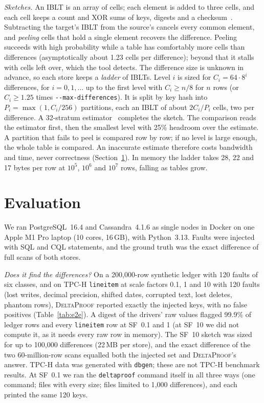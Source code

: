 \documentclass[conference]{IEEEtran}
\newcommand{\sys}{\textsc{DeltaProof}}
\begin{document}
\emph{Sketches.} An IBLT is an array of cells; each element is added to three cells, and each cell keeps a count and XOR sums of keys, digests and a checksum~\cite{goodrich2011}. Subtracting the target's IBLT from the source's cancels every common element, and \emph{peeling} cells that hold a single element recovers the difference. Peeling succeeds with high probability while a table has comfortably more cells than differences (asymptotically about 1.23 cells per difference); beyond that it stalls with cells left over, which the tool detects. The difference size is unknown in advance, so each store keeps a \emph{ladder} of IBLTs. Level $i$ is sized for $C_i=64\cdot8^i$ differences, for $i=0,1,\dots$ up to the first level with $C_i\ge n/8$ for $n$ rows (or $C_i\ge1.25$ times \texttt{-{}-max-differences}). It is split by key hash into $P_i=\max(1,C_i/256)$ partitions, each an IBLT of about $2C_i/P_i$ cells, two per difference. A 32-stratum estimator~\cite{eppstein2011} completes the sketch. The comparison reads the estimator first, then the smallest level with 25\% headroom over the estimate. A partition that fails to peel is compared row by row; if no level is large enough, the whole table is compared. An inaccurate estimate therefore costs bandwidth and time, never correctness (Section~\ref{sec:eval}). In memory the ladder takes 28, 22 and 17 bytes per row at $10^5$, $10^6$ and $10^7$ rows, falling as tables grow.

\section{Evaluation}\label{sec:eval}
We ran PostgreSQL~16.4 and Cassandra~4.1.6 as single nodes in Docker on one Apple M1 Pro laptop (10 cores, 16\,GB), with Python~3.13. Faults were injected with SQL and CQL statements, and the ground truth was the exact difference of full scans of both stores.

\emph{Does it find the differences?} On a 200{,}000-row synthetic ledger with 120 faults of six classes, and on TPC-H \texttt{lineitem} at scale factors 0.1, 1 and 10 with 120 faults (lost writes, decimal precision, shifted dates, corrupted text, lost deletes, phantom rows), \sys{} reported exactly the injected keys, with no false positives (Table~\ref{tab:e2e}). A digest of the drivers' raw values flagged 99.9\% of ledger rows and every \texttt{lineitem} row at SF~0.1 and 1 (at SF~10 we did not compute it, as it needs every raw row in memory). The SF~10 sketch was sized for up to 100{,}000 differences (22\,MB per store), and the exact difference of the two 60-million-row scans equalled both the injected set and \sys{}'s answer. TPC-H data was generated with \texttt{dbgen}; these are not TPC-H benchmark results. At SF~0.1 we ran the \texttt{deltaproof} command itself in all three ways (one command; files with every size; files limited to 1{,}000 differences), and each printed the same 120 keys.
\end{document}
